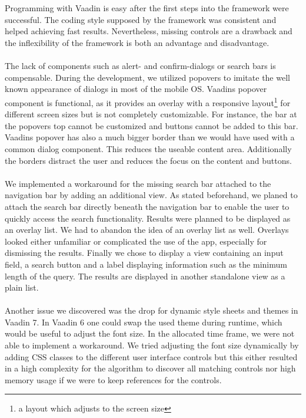 \\
\\
Programming with Vaadin is easy after the first steps into the framework were successful. The coding style supposed by the framework was consistent and helped achieving fast results. Nevertheless, missing controls are a drawback and the inflexibility of the framework is both an advantage and disadvantage. 
\\
\\
The lack of components such as alert- and confirm-dialogs or search bars is compensable. During the development, we utilized popovers to imitate the well known appearance of dialogs in most of the mobile OS. Vaadins popover component is functional, as it provides an overlay with a responsive layout\footnote{a layout which adjusts to the screen size} for different screen sizes but is not completely customizable. For instance, the bar at the popovers top cannot be customized and buttons cannot be added to this bar. Vaadins popover has also a much bigger border than we would have used with a common dialog component. This reduces the useable content area. Additionally the borders distract the user and reduces the focus on the content and buttons.
\\
\\
We implemented a workaround for the missing search bar attached to the navigation bar by adding an additional view. As stated beforehand, we planed to attach the search bar directly beneath the navigation bar to enable the user to quickly access the search functionality. Results were planned to be displayed as an overlay list. We had to abandon the idea of an overlay list as well. Overlays looked either unfamiliar or complicated the use of the app, especially for dismissing the results. Finally we chose to display a view containing an input field, a search button and a label displaying information such as the minimum length of the query. The results are displayed in another standalone view as a plain list.
\\
\\
Another issue we discovered was the drop for dynamic style sheets and themes in Vaadin 7. In Vaadin 6 one could swap the used theme during runtime, which would be useful to adjust the font size. In the allocated time frame, we were not able to implement a workaround. We tried adjusting the font size dynamically by adding CSS classes to the different user interface controls but this either resulted in a high complexity for the algorithm to discover all matching controls nor high memory usage if we were to keep references for the controls.
